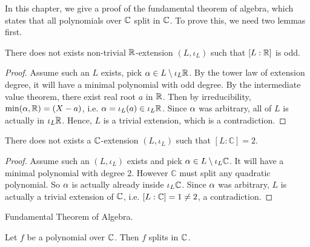 \documentclass[../book.tex]{subfiles}
\begin{document}
In this chapter, we give a proof of the fundamental theorem of algebra,
which states that all polynomials over $\mathbb{C}$ split in $\mathbb{C}$. 
To prove this, we need two lemmas first.
\begin{lem}

    There does not exists non-trivial $\mathbb{R}$-extension $(L,\iota_L)$ 
    such that $[L : \mathbb{R}]$ is odd.
\end{lem}
\begin{proof}
    Assume such an $L$ exists, pick $ \alpha \in L\setminus \iota_L\mathbb{R}$.
    By the tower law of extension degree, 
    it will have a minimal polynomial with odd degree. 
    By the intermediate value theorem, there exist real root $a$ in $\mathbb{R}$.
    Then by irreducibility, $\min(\alpha,\mathbb{R}) = (X - a)$, 
    i.e. $\alpha = \iota_L(a) \in \iota_L\mathbb{R}$.
    Since $\alpha$ was arbitrary, all of $L$ is actually in $\iota_L\mathbb{R}$.
    Hence, $L$ is a trivial extension, which is a contradiction. 
    
\end{proof}
\begin{lem}

    There does not exists a $\mathbb{C}$-extension $(L,\iota_L)$ 
    such that $[L : \mathbb{C}]=2$.
\end{lem}
\begin{proof}
    Assume such an $(L,\iota_L)$ exists and 
    pick $ \alpha \in L \setminus \iota_L \mathbb{C}$. 
    It will have a minimal polynomial with degree 2. 
    However $\mathbb{C}$ must split any quadratic polynomial.
    So $\alpha$ is actually already inside $\iota_L \mathbb{C}$.
    Since $\alpha$ was arbitrary, $L$ is actually a trivial extension of $\mathbb{C}$,
    i.e. $[L : \mathbb{C}] = 1 \neq 2$, a contradiction. 
\end{proof}
\begin{thm} Fundamental Theorem of Algebra. 
    
    Let $f$ be a polynomial over $\mathbb{C}$.
    Then $f$ splits in $\mathbb{C}$.
    
\end{thm}
\end{document}

